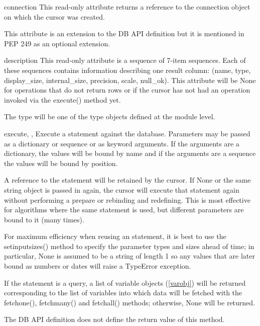 \documentclass{manual}
\begin{document}
\begin{datadesc}{connection}
  This read-only attribute returns a reference to the connection object on
  which the cursor was created.

   This attribute is an extension to the DB API definition but it
  is mentioned in PEP 249 as an optional extension.
\end{datadesc}

\begin{datadesc}{description}
  This read-only attribute is a sequence of 7-item sequences. Each of these
  sequences contains information describing one result column: (name, type,
  display_size, internal_size, precision, scale, null_ok). This attribute will
  be None for operations that do not return rows or if the cursor has not had
  an operation invoked via the execute() method yet.

  The type will be one of the type objects defined at the module level.
\end{datadesc}

\begin{funcdesc}{execute}{, ,
    }
  Execute a statement against the database. Parameters may be passed as a
  dictionary or sequence or as keyword arguments. If the arguments are a
  dictionary, the values will be bound by name and if the arguments are a
  sequence the values will be bound by position.

  A reference to the statement will be retained by the cursor. If None or the
  same string object is passed in again, the cursor will execute that
  statement again without performing a prepare or rebinding and redefining.
  This is most effective for algorithms where the same statement is used, but
  different parameters are bound to it (many times).

  For maximum efficiency when reusing an statement, it is best to use the
  setinputsizes() method to specify the parameter types and sizes ahead of
  time; in particular, None is assumed to be a string of length 1 so any
  values that are later bound as numbers or dates will raise a TypeError
  exception.

  If the statement is a query, a list of variable objects (\ref{varobj}) will
  be returned corresponding to the list of variables into which data will be
  fetched with the fetchone(), fetchmany() and fetchall() methods; otherwise,
  None will be returned.

   The DB API definition does not define the return value of this
  method.
\end{funcdesc}
\end{document}
